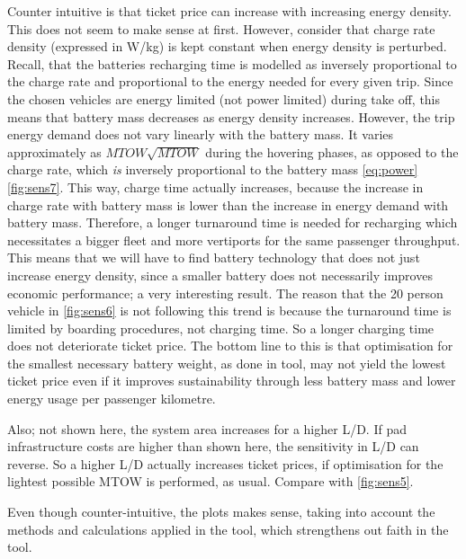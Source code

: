 Counter intuitive is that ticket price can increase with increasing energy density. This does not seem to make sense at first. However, consider that charge rate density (expressed in W/kg) is kept constant when energy density is perturbed. Recall, that the batteries recharging time is modelled as inversely proportional to the charge rate and proportional to the energy needed for every given trip. Since the chosen vehicles are energy limited (not power limited) during take off, this means that battery mass decreases as energy density increases. However, the trip energy demand does not vary linearly with the battery mass. It varies approximately as $MTOW\sqrt{MTOW}$ during the hovering phases, as opposed to the charge rate, which \emph{is} inversely proportional to the battery mass \autoref{eq:power}\autoref{fig:sens7}. This way, charge time actually increases, because the increase in charge rate with battery mass is lower than the increase in energy demand with battery mass. Therefore, a longer turnaround time is needed for recharging which necessitates a bigger fleet and more vertiports for the same passenger throughput. This means that we will have to find battery technology that does not just increase energy density, since a smaller battery does not necessarily improves economic performance; a very interesting result. The reason that the 20 person vehicle in \autoref{fig:sens6} is not following this trend is because the turnaround time is limited by boarding procedures, not charging time. So a longer charging time does not deteriorate ticket price. The bottom line to this is that optimisation for the smallest necessary battery weight, as done in tool, may not yield the lowest ticket price even if it improves sustainability through less battery mass and lower energy usage per passenger kilometre.

Also; not shown here, the system area increases for a higher L/D. If pad infrastructure costs are higher than shown here, the sensitivity in L/D can reverse. So a higher L/D actually increases ticket prices, if optimisation for the lightest possible MTOW is performed, as usual. Compare with \autoref{fig:sens5}.

Even though counter-intuitive, the plots makes sense, taking into account the methods and calculations applied in the tool, which strengthens out faith in the tool.


